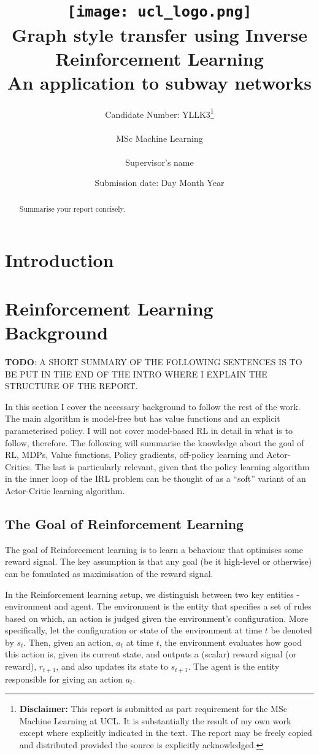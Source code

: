 \documentclass{report}
\title{
  { \texttt{[image: ucl\_logo.png]}}\\
  {{\Huge Graph style transfer using Inverse Reinforcement Learning}}\\
  {\large An application to subway networks}\\
}
\date{Submission date: Day Month Year}
\author{
  Candidate Number: YLLK3\thanks{
      {\bf Disclaimer:}
      This report is submitted as part requirement 
      for the MSc Machine Learning at UCL. It is
      substantially the result of my own work except 
      where explicitly indicated in the text.
      The report may be freely copied and 
      distributed provided the source is explicitly acknowledged.
    }
    \\ \\
  MSc Machine Learning\\ \\
  Supervisor's name
}
\numberwithin{equation}{section}
\numberwithin{figure}{section}
\numberwithin{table}{section}
\numberwithin{algorithm}{section}
\begin{document}
\onehalfspacing
\maketitle

\begin{abstract}
  Summarise your report concisely.
\end{abstract}
\tableofcontents
\setcounter{page}{1}

\chapter{Introduction}

\chapter{Reinforcement Learning Background}
\label{chap:RL}
\textbf{TODO}: A SHORT SUMMARY OF THE FOLLOWING SENTENCES IS TO BE PUT 
IN THE END OF THE INTRO WHERE I EXPLAIN THE STRUCTURE OF THE 
REPORT.

In this section I cover the necessary background to follow the 
rest of the work. The main algorithm is model-free but has value 
functions and an explicit parameterised policy. I will not cover 
model-based RL in detail in what is to follow, therefore. The 
following will summarise the knowledge about the goal of RL, 
MDPs, Value functions, Policy gradients, off-policy learning 
and Actor-Critics. The last is particularly relevant, given 
that the policy learning algorithm in the inner loop of the IRL 
problem can be thought of as a ``soft'' variant of an Actor-Critic 
learning algorithm.

\section{The Goal of Reinforcement Learning}
\label{sec:RLGoal}

The goal of Reinforcement learning is to learn a behaviour that 
optimises some reward signal. The key assumption is that 
any goal (be it high-level or otherwise) can be fomulated as 
maximisation of the reward signal.

In the Reinforcement learning setup, we distinguish between two 
key entities - environment and agent. The environment is the 
entity that specifies a set of rules based on which, an action 
is judged given the environment's configuration. 
More specifically, let the configuration or state of the 
environment at time $t$ be denoted by $s_t$. Then, 
given an action, $a_t$ at time $t$, the environment evaluates 
how good this action is, given its 
current state, and outputs a (scalar) reward signal (or reward), 
$r_{t+1}$, and also updates its state to $s_{t+1}$. The agent 
is the entity responsible for giving an action $a_t$. 
\end{document}
